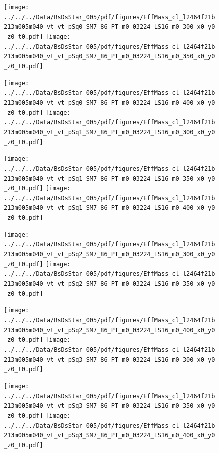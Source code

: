 \documentclass[a4paper,10pt]{article}
\begin{document}
\begin{figure}[p]
 \texttt{[image: ../../../Data/BsDsStar\_005/pdf/figures/EffMass\_cl\_l2464f21b213m005m040\_vt\_vt\_pSq0\_SM7\_86\_PT\_m0\_03224\_LS16\_m0\_300\_x0\_y0\_z0\_t0.pdf]} 
 \texttt{[image: ../../../Data/BsDsStar\_005/pdf/figures/EffMass\_cl\_l2464f21b213m005m040\_vt\_vt\_pSq0\_SM7\_86\_PT\_m0\_03224\_LS16\_m0\_350\_x0\_y0\_z0\_t0.pdf]} 
 \end{figure}
\begin{figure}[p]
 \texttt{[image: ../../../Data/BsDsStar\_005/pdf/figures/EffMass\_cl\_l2464f21b213m005m040\_vt\_vt\_pSq0\_SM7\_86\_PT\_m0\_03224\_LS16\_m0\_400\_x0\_y0\_z0\_t0.pdf]} 
 \texttt{[image: ../../../Data/BsDsStar\_005/pdf/figures/EffMass\_cl\_l2464f21b213m005m040\_vt\_vt\_pSq1\_SM7\_86\_PT\_m0\_03224\_LS16\_m0\_300\_x0\_y0\_z0\_t0.pdf]} 
 \end{figure}
\begin{figure}[p]
 \texttt{[image: ../../../Data/BsDsStar\_005/pdf/figures/EffMass\_cl\_l2464f21b213m005m040\_vt\_vt\_pSq1\_SM7\_86\_PT\_m0\_03224\_LS16\_m0\_350\_x0\_y0\_z0\_t0.pdf]} 
 \texttt{[image: ../../../Data/BsDsStar\_005/pdf/figures/EffMass\_cl\_l2464f21b213m005m040\_vt\_vt\_pSq1\_SM7\_86\_PT\_m0\_03224\_LS16\_m0\_400\_x0\_y0\_z0\_t0.pdf]} 
 \end{figure}
\clearpage
\begin{figure}[p]
 \texttt{[image: ../../../Data/BsDsStar\_005/pdf/figures/EffMass\_cl\_l2464f21b213m005m040\_vt\_vt\_pSq2\_SM7\_86\_PT\_m0\_03224\_LS16\_m0\_300\_x0\_y0\_z0\_t0.pdf]} 
 \texttt{[image: ../../../Data/BsDsStar\_005/pdf/figures/EffMass\_cl\_l2464f21b213m005m040\_vt\_vt\_pSq2\_SM7\_86\_PT\_m0\_03224\_LS16\_m0\_350\_x0\_y0\_z0\_t0.pdf]} 
 \end{figure}
\begin{figure}[p]
 \texttt{[image: ../../../Data/BsDsStar\_005/pdf/figures/EffMass\_cl\_l2464f21b213m005m040\_vt\_vt\_pSq2\_SM7\_86\_PT\_m0\_03224\_LS16\_m0\_400\_x0\_y0\_z0\_t0.pdf]} 
 \texttt{[image: ../../../Data/BsDsStar\_005/pdf/figures/EffMass\_cl\_l2464f21b213m005m040\_vt\_vt\_pSq3\_SM7\_86\_PT\_m0\_03224\_LS16\_m0\_300\_x0\_y0\_z0\_t0.pdf]} 
 \end{figure}
\begin{figure}[p]
 \texttt{[image: ../../../Data/BsDsStar\_005/pdf/figures/EffMass\_cl\_l2464f21b213m005m040\_vt\_vt\_pSq3\_SM7\_86\_PT\_m0\_03224\_LS16\_m0\_350\_x0\_y0\_z0\_t0.pdf]} 
 \texttt{[image: ../../../Data/BsDsStar\_005/pdf/figures/EffMass\_cl\_l2464f21b213m005m040\_vt\_vt\_pSq3\_SM7\_86\_PT\_m0\_03224\_LS16\_m0\_400\_x0\_y0\_z0\_t0.pdf]} 
 \end{figure}
\end{document}
